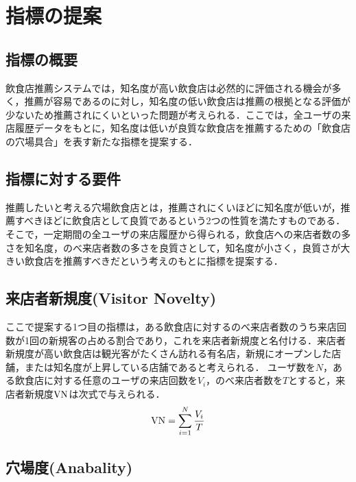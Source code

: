 \chapter{指標の提案}
\label{chap:proposal}

\section{指標の概要}

飲食店推薦システムでは，知名度が高い飲食店は必然的に評価される機会が多く，推薦が容易であるのに対し，知名度の低い飲食店は推薦の根拠となる評価が少ないため推薦されにくいといった問題が考えられる．ここでは，全ユーザの来店履歴データをもとに，知名度は低いが良質な飲食店を推薦するための「飲食店の穴場具合」を表す新たな指標を提案する．
\section{指標に対する要件}

推薦したいと考える穴場飲食店とは，推薦されにくいほどに知名度が低いが，推薦すべきほどに飲食店として良質であるという2つの性質を満たすものである．
そこで，一定期間の全ユーザの来店履歴から得られる，飲食店への来店者数の多さを知名度，のべ来店者数の多さを良質さとして，知名度が小さく，良質さが大きい飲食店を推薦すべきだという考えのもとに指標を提案する．
\section{来店者新規度(Visitor Novelty)}

ここで提案する1つ目の指標は，ある飲食店に対するのべ来店者数のうち来店回数が1回の新規客の占める割合であり，これを来店者新規度と名付ける．来店者新規度が高い飲食店は観光客がたくさん訪れる有名店，新規にオープンした店舗，または知名度が上昇している店舗であると考えられる．
ユーザ数を$N$，ある飲食店に対する任意のユーザの来店回数を$V_i$，のべ来店者数を$T$とすると，来店者新規度$\rm VN$は次式で与えられる．
\begin{equation}
	{\rm VN} = \sum^{N}_{i=1} \frac{V_i}{T}
\end{equation}

\section{穴場度(Anabality)}


